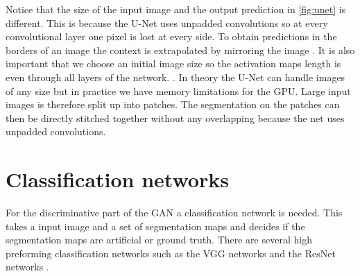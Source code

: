 \documentclass{kththesis}
\begin{document}
\noindent Notice that the size of the input image and the output prediction in \ref{fig:unet} is different. This is because the U-Net uses unpadded convolutions so at every convolutional layer one pixel is lost at every side. To obtain predictions in the borders of an image the context is extrapolated by mirroring the image \parencite{li_deepunet:_2017}. It is also important that we choose an initial image size so the activation maps length is even through all layers of the network. \parencite{ronneberger_u-net:_2015}. In theory the U-Net can handle images of any size but in practice we have memory limitations for the GPU. Large input images is therefore split up into patches. The segmentation on the patches can then be directly stitched together without any overlapping because the net uses unpadded convolutions.
\section{Classification networks}
For the discriminative part of the GAN a classification network is needed. This takes a input image and a set of segmentation maps and decides if the segmentation maps are artificial or ground truth. There are several high preforming classification networks such as the VGG networks \parencite{simonyan_very_2014} and the ResNet networks \parencite{he_deep_2015}.
\end{document}
